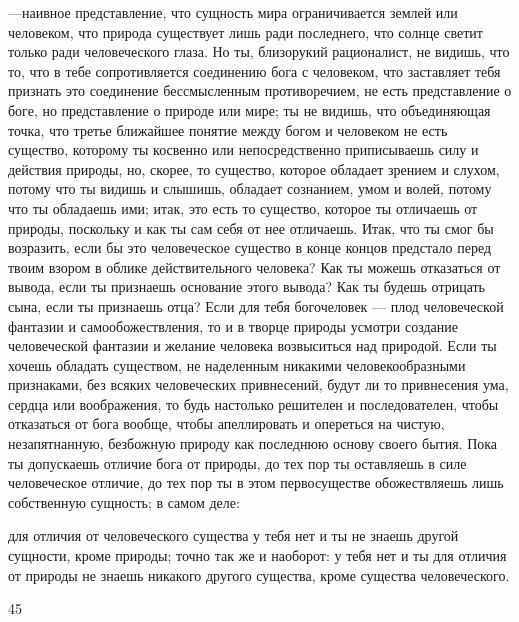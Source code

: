 \documentclass[12pt]{article}
\begin{document}
---наивное представление, что сущность мира ограничивается землей или человеком, что природа существует лишь ради последнего, что солнце светит только ради человеческого глаза. Но ты, близорукий рационалист, не видишь, что то, что в тебе сопротивляется соединению бога с человеком, что заставляет тебя признать это соединение бессмысленным противоречием, не есть представление о боге, но представление о природе или мире; ты не видишь, что объединяющая точка, что третье ближайшее понятие между богом и человеком не есть существо, которому ты косвенно или непосредственно приписываешь силу и действия природы, но, скорее, то существо, которое обладает зрением и слухом, потому что ты видишь и слышишь, обладает сознанием, умом и волей, потому что ты обладаешь ими; итак, это есть то существо, которое ты отличаешь от природы, поскольку и как ты сам себя от нее отличаешь. Итак, что ты смог бы возразить, если бы это человеческое существо в конце концов предстало перед твоим взором в облике действительного человека? Как ты можешь отказаться от вывода, если ты признаешь основание этого вывода? Как ты будешь отрицать сына, если ты признаешь отца? Если для тебя богочеловек --- плод человеческой фантазии и самообожествления, то и в творце природы усмотри создание человеческой фантазии и желание человека возвыситься над природой. Если ты хочешь обладать существом, не наделенным никакими человекообразными признаками, без всяких человеческих привнесений, будут ли то привнесения ума, сердца или воображения, то будь настолько решителен и последователен, чтобы отказаться от бога вообще, чтобы апеллировать и опереться на чистую, незапятнанную, безбожную природу как последнюю основу своего бытия. Пока ты допускаешь отличие бога от природы, до тех пор ты оставляешь в силе человеческое отличие, до тех пор ты в этом первосуществе обожествляешь лишь собственную сущность; в самом деле:

для отличия от человеческого существа у тебя нет и ты не знаешь другой сущности, кроме природы; точно так же и наоборот: у тебя нет и ты для отличия от природы не знаешь никакого другого существа, кроме существа человеческого.

45
\end{document}
